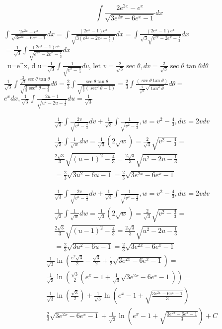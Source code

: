 \documentclass[10pt]{article}
\begin{document}
$$
\int \frac{2 e^{2 x}-e^x}{\sqrt{3 e^{2 x}-6 e^x-1}} d x$$

$\int \frac{2 e^{2 x}-e^x}{\sqrt{3 e^{2 x}-6 e^x-1}} d x=\int \frac{\left(2 e^x-1\right) e^x}{\sqrt{3\left(e^{2 x}-2 e^x-\frac{1}{3}\right)}} d x=\int \frac{\left(2 e^x-1\right) e^x}{\sqrt{3} \sqrt{e^{2 x}-2 e^x-\frac{1}{3}}} d x$
$=\frac{1}{\sqrt{3}} \int \frac{\left(2 e^x-1\right) e^x}{\sqrt{e^{2 x}-2 e^x-\frac{1}{3}}} d x$\\
\ u=e\^{}x, d u=$\frac{1}{\sqrt{3}} \int \frac{1}{\sqrt{v^2-\frac{4}{3}}} d v$, let $v=\frac{2}{\sqrt{3}} \sec \theta, d v=\frac{2}{\sqrt{3}} \sec \theta \tan \theta d \theta$
$\frac{1}{\sqrt{3}} \int \frac{\frac{2}{\sqrt{3}} \sec \theta \tan \theta}{\sqrt{\frac{4}{3} \sec ^2 \theta-\frac{4}{3}}} d \theta=\frac{2}{3} \int \frac{\sec \theta \tan \theta}{\sqrt{\frac{4}{3}\left(\sec ^2 \theta-1\right)}}=\frac{2}{3} \int \frac{(\sec \theta \tan \theta)}{\frac{2}{\sqrt{3}} \sqrt{\tan ^2 \theta}} d \theta=$
$e^x d x, \frac{1}{\sqrt{3}} \int \frac{2 u-1}{\sqrt{u^2-2 u-\frac{1}{3}}} d u=\frac{1}{\sqrt{3}}$

$$
\begin{aligned}
& \frac{1}{\sqrt{3}} \int \frac{2 v}{\sqrt{v^2-\frac{4}{3}}} d v+\frac{1}{\sqrt{3}} \int \frac{1}{\sqrt{v^2-\frac{4}{3}}}, w=v^2-\frac{4}{3}, d w=2 v d v \\
& \frac{1}{\sqrt{3}} \int \frac{1}{\sqrt{w}} d w=\frac{1}{\sqrt{3}}(2 \sqrt{w})=\frac{2}{\sqrt{3}} \sqrt{v^2-\frac{4}{3}}= \\
& \frac{2 \sqrt{3}}{3} \sqrt{(u-1)^2-\frac{4}{3}}=\frac{2 \sqrt{3}}{3} \sqrt{u^2-2 u-\frac{1}{3}} \\
& =\frac{2}{3} \sqrt{3 u^2-6 u-1}=\frac{2}{3} \sqrt{3 e^{2 x}-6 e^x-1}
\end{aligned}
$$

\[
\begin{aligned}
& \frac{1}{\sqrt{3}} \int \frac{2 v}{\sqrt{v^2-\frac{4}{3}}} d v+\frac{1}{\sqrt{3}} \int \frac{1}{\sqrt{v^2-\frac{4}{3}}}, w=v^2-\frac{4}{3}, d w=2 v d v \\
& \frac{1}{\sqrt{3}} \int \frac{1}{\sqrt{w}} d w=\frac{1}{\sqrt{3}}(2 \sqrt{w})=\frac{2}{\sqrt{3}} \sqrt{v^2-\frac{4}{3}}= \\
& \frac{2 \sqrt{3}}{3} \sqrt{(u-1)^2-\frac{4}{3}}=\frac{2 \sqrt{3}}{3} \sqrt{u^2-2 u-\frac{1}{3}} \\
& =\frac{2}{3} \sqrt{3 u^2-6 u-1}=\frac{2}{3} \sqrt{3 e^{2 x}-6 e^x-1}
\end{aligned}
\]
\[
\begin{aligned}
& \frac{1}{\sqrt{3}} \ln \left(\frac{e^x \sqrt{3}}{2}-\frac{\sqrt{3}}{2}+\frac{1}{2} \sqrt{3 e^{2 x}-6 e^x-1}\right)= \\
& \frac{1}{\sqrt{3}} \ln \left(\frac{\sqrt{3}}{2}\left(e^x-1+\frac{1}{\sqrt{3}} \sqrt{3 e^{2 x}-6 e^x-1}\right)\right)= \\
& \frac{1}{\sqrt{3}} \ln \left(\frac{\sqrt{3}}{2}\right)+\frac{1}{\sqrt{3}} \ln \left(e^x-1+\sqrt{\frac{3 e^{2 x}-6 e^x-1}{3}}\right) \\
& \frac{2}{3} \sqrt{3 e^{2 x}-6 e^x-1}+\frac{1}{\sqrt{3}} \ln \left(e^x-1+\sqrt{\frac{3 e^{2 x}-6 e^x-1}{3}}\right)+C
\end{aligned}
\]
\end{document}
